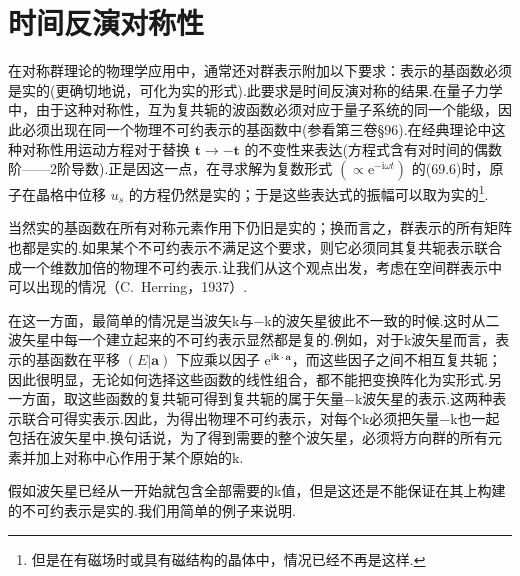 \section{时间反演对称性}

在对称群理论的物理学应用中，通常还对群表示附加以下要求：表示的基函数必须是实的(更确切地说，可化为实的形式).此要求是时间反演对称的结果.在量子力学中，由于这种对称性，互为复共轭的波函数必须对应于量子系统的同一个能级，因此必须出现在同一个物理不可约表示的基函数中(参看第三卷§96).在经典理论中这种对称性用运动方程对于替换 $\boldsymbol{t}\to-\boldsymbol{t}$ 的不变性来表达(方程式含有对时间的偶数阶——2阶导数).正是因这一点，在寻求解为复数形式 $(\propto\mathrm{e}^{-\mathrm{i}\omega t})$ 的(69.6)时，原子在晶格中位移 $u_s$ 的方程仍然是实的；于是这些表达式的振幅可以取为实的\footnote{但是在有磁场时或具有磁结构的晶体中，情况已经不再是这样.}.

当然实的基函数在所有对称元素作用下仍旧是实的；换而言之，群表示的所有矩阵也都是实的.如果某个不可约表示不满足这个要求，则它必须同其复共轭表示联合成一个维数加倍的物理不可约表示.让我们从这个观点出发，考虑在空间群表示中可以出现的情况（C.~Herring，1937）.

在这一方面，最简单的情况是当波矢k与−k的波矢星彼此不一致的时候.这时从二波矢星中每一个建立起来的不可约表示显然都是复的.例如，对于k波矢星而言，表示的基函数在平移 $(E|\boldsymbol{a})$ 下应乘以因子 $\mathrm{e}^{\mathrm{i}\boldsymbol{k}\cdot\boldsymbol{a}}$，而这些因子之间不相互复共轭；因此很明显，无论如何选择这些函数的线性组合，都不能把变换阵化为实形式.另一方面，取这些函数的复共轭可得到复共轭的属于矢量−k波矢星的表示.这两种表示联合可得实表示.因此，为得出物理不可约表示，对每个k必须把矢量−k也一起包括在波矢星中.换句话说，为了得到需要的整个波矢星，必须将方向群的所有元素并加上对称中心作用于某个原始的k.

假如波矢星已经从一开始就包含全部需要的k值，但是这还是不能保证在其上构建的不可约表示是实的.我们用简单的例子来说明.

